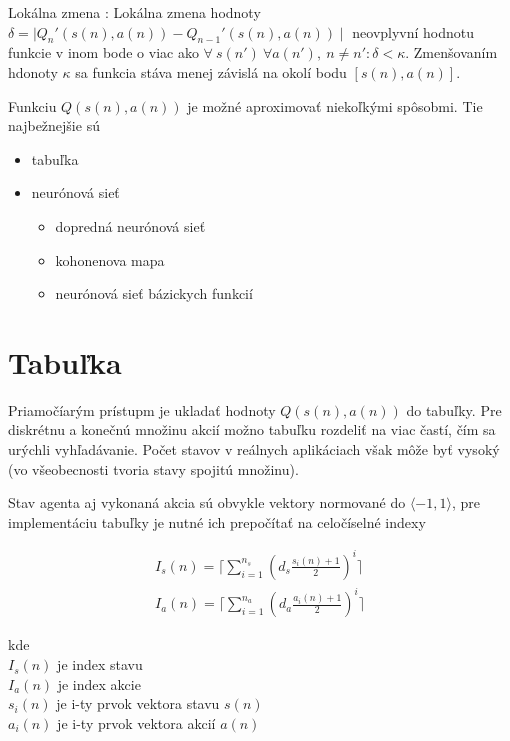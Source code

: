 \begin{theorem}{Lokálna zmena : }
\label{post:02}
Lokálna zmena hodnoty $\delta = \mid Q_n'(s(n), a(n)) - Q_{n-1}'(s(n), a(n)) \mid$ neovplyvní hodnotu funkcie v
inom bode o viac ako $\forall \ s(n') \ \forall a(n'),\ n \neq n' : \delta < \kappa$.
Zmenšovaním hdonoty $\kappa$ sa funkcia stáva menej závislá na okolí bodu $[s(n), a(n)]$.
\end{theorem}

Funkciu $Q(s(n), a(n))$ je možné aproximovať niekoľkými spôsobmi.
Tie najbežnejšie sú

\begin{itemize}
\item tabuľka
\item neurónová sieť
  \begin{itemize}
    \item dopredná neurónová sieť
    \item kohonenova mapa
    \item neurónová sieť bázickych funkcií
  \end{itemize}
\end{itemize}

\section{Tabuľka}

Priamočíarým prístupm je ukladať hodnoty $Q(s(n), a(n))$ do tabuľky. Pre
diskrétnu a konečnú množinu akcií možno tabuľku rozdeliť na viac častí,
čím sa urýchli vyhľadávanie. Počet stavov v reálnych aplikáciach však môže byť
vysoký (vo všeobecnosti tvoria stavy spojitú množinu).

Stav agenta aj vykonaná akcia sú obvykle vektory normované do $\langle -1, 1 \rangle$,
pre implementáciu tabuľky je nutné ich prepočítať na celočíselné indexy

\begin{align}
  I_s(n) = \lceil \sum\limits_{i=1}^{n_s} {\left( d_s\frac{s_i(n) + 1}{2} \right)^i \rceil}  \\
  I_a(n) = \lceil \sum\limits_{i=1}^{n_a} {\left( d_a\frac{a_i(n) + 1}{2} \right)^i \rceil}
\end{align}

kde \\
$I_s(n)$ je index stavu \\
$I_a(n)$ je index akcie \\
$s_i(n)$ je i-ty prvok vektora stavu $s(n)$ \\
$a_i(n)$ je i-ty prvok vektora akcií $a(n)$ \\

